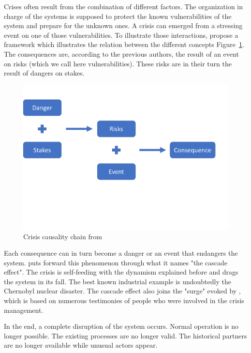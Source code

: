 Crises often result from the combination of different factors.
The organization in charge of the systems is supposed to protect the known vulnerabilities of the system and prepare for the unknown ones.
A crisis can emerged from a stressing event on one of those vulnerabilities.
To illustrate those interactions, \cite{benabenCollaborativeSystemsCrisis2014} propose a framework which illustrates the relation between the different concepts Figure~\ref{context:fred-framework}.
The consequences are, according to the previous authors, the result of an event on risks (which we call here vulnerabilities).
These risks are in their turn the result of dangers on stakes.
\begin{figure}
    \centering
    \includegraphics[width=\textwidth]{figures/fred-consequences-framework.pdf}
    \caption{Crisis causality chain from \cite{benabenCollaborativeSystemsCrisis2014}}
    \label{context:fred-framework}
\end{figure}
Each consequence can in turn become a danger or an event that endangers the system.
\cite{fertierInterpretationAutomatiqueDonnees2018a} puts forward this phenomenon through what it names "the cascade effect".
The crisis is self-feeding with the dynamism explained before and drags the system in its fall.
The best known industrial example is undoubtedly the Chernobyl nuclear disaster.
The cascade effect also joins the "surge" evoked by \cite{lagadecGESTIONCRISES1994}, which is based on numerous testimonies of people who were involved in the crisis management.

In the end, a complete disruption of the system occurs.
Normal operation is no longer possible. The existing processes are no longer valid.
The historical partners are no longer available while unusual actors appear.

